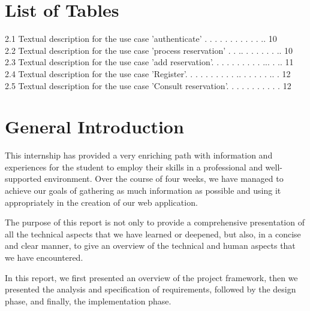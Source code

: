 \chapter*{List of Tables}
\color{Blue!} 

2.1 Textual description for the use case 'authenticate' . . .  . . . . . . . .  .. 10\\
2.2 Textual description for the use case 'process reservation' . . .. . . . . . . .. 10\\
2.3 Textual description for the use case 'add reservation'. . . . . . .  . . . ... . .. 11\\
2.4 Textual description for the use case 'Register'. . . . . . . . . . .. . . . . .  .. .  12\\
2.5 Textual description for the use case 'Consult reservation'. . . .  . . . . . .  . 12\\ 

 
\newpage
\color{Black!} 

\chapter*{General Introduction}
This internship has provided a very enriching path with information and experiences for the student to employ their skills in a professional and well-supported environment. Over the course of four weeks, we have managed to achieve our goals of gathering as much information as possible and using it appropriately in the creation of our web application.

The purpose of this report is not only to provide a comprehensive presentation of all the technical aspects that we have learned or deepened, but also, in a concise and clear manner, to give an overview of the technical and human aspects that we have encountered.

In this report, we first presented an overview of the project framework, then we presented the analysis and specification of requirements, followed by the design phase, and finally, the implementation phase.

 
\newpage

